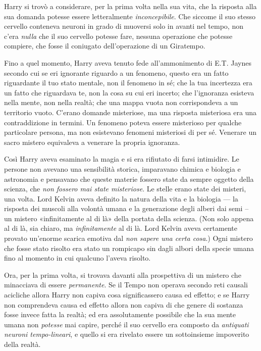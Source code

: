Harry si trovò a considerare, per la prima volta nella sua vita, che la risposta alla sua domanda potesse essere letteralmente \textit{inconcepibile}. Che siccome il suo stesso cervello conteneva neuroni in grado di muoversi solo in avanti nel tempo, non c’era \textit{nulla} che il suo cervello potesse fare, nessuna operazione che potesse compiere, che fosse il coniugato dell’operazione di un Giratempo.

Fino a quel momento, Harry aveva tenuto fede all’ammonimento di E.T. Jaynes secondo cui se eri ignorante riguardo a un fenomeno, questo era un fatto riguardante il tuo stato mentale, non il fenomeno in sé; che la tua incertezza era un fatto che riguardava te, non la cosa su cui eri incerto; che l’ignoranza esisteva nella mente, non nella realtà; che una mappa vuota non corrispondeva a un territorio vuoto. C’erano domande misteriose, ma una risposta misteriosa era una contraddizione in termini. Un fenomeno poteva essere misterioso per qualche particolare persona, ma non esistevano fenomeni misteriosi di per sé. Venerare un sacro mistero equivaleva a venerare la propria ignoranza.

Così Harry aveva esaminato la magia e si era rifiutato di farsi intimidire. Le persone non avevano una sensibilità storica, imparavano chimica e biologia e astronomia e pensavano che queste materie fossero state da sempre oggetto della scienza, che \textit{non fossero mai state misteriose}. Le stelle erano state dei misteri, una volta. Lord Kelvin aveva definito la natura della vita e la biologia — la risposta dei muscoli alla volontà umana e la generazione degli alberi dai semi – un mistero «infinitamente al di là» della portata della scienza. (Non solo appena al di là, sia chiaro, ma \textit{infinitamente} al di là. Lord Kelvin aveva certamente provato un’enorme scarica emotiva dal \textit{non sapere una certa cosa}.) Ogni mistero che fosse stato risolto era stato un rompicapo sin dagli albori della specie umana fino al momento in cui qualcuno l’aveva risolto.

Ora, per la prima volta, si trovava davanti alla prospettiva di un mistero che minacciava di essere \textit{permanente}. Se il Tempo non operava secondo reti causali acicliche allora Harry non capiva cosa significassero causa ed effetto; e se Harry non comprendeva causa ed effetto allora non capiva di che genere di sostanza fosse invece fatta la realtà; ed era assolutamente possibile che la sua mente umana non \textit{potesse} mai capire, perché il suo cervello era composto da \textit{antiquati neuroni tempo-lineari}, e quello si era rivelato essere un sottoinsieme impoverito della realtà.

